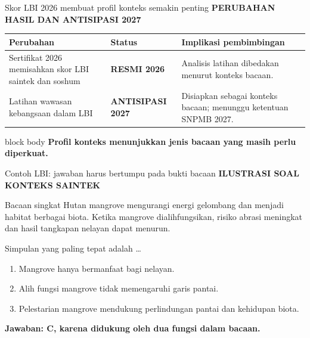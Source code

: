 \documentclass[aspectratio=169,11pt]{beamer}
\newcommand{\kicker}[1]{%
  {\color{StudentCyan}\bfseries\fontsize{10.5}{13}\selectfont\MakeUppercase{#1}}\par\vspace{0.11cm}
}
\newcommand{\statusok}{\textcolor{StudentGreen}{\bfseries RESMI 2026}}
\newcommand{\statuswait}{\textcolor{StudentGold}{\bfseries ANTISIPASI 2027}}
\begin{document}
\begin{frame}{Skor LBI 2026 membuat profil konteks semakin penting}
  \kicker{Perubahan Hasil dan Antisipasi 2027}
  {\fontsize{10.3}{12.8}\selectfont
  \renewcommand{\arraystretch}{0.98}
  \begin{tabularx}{\textwidth}{>{\RaggedRight\arraybackslash}p{} >{\RaggedRight\arraybackslash}p{} >{\RaggedRight\arraybackslash}X}
    \toprule
    \textbf{Perubahan} & \textbf{Status} & \textbf{Implikasi pembimbingan} \\
    \midrule
    Sertifikat 2026 memisahkan skor LBI saintek dan soshum & \statusok & Analisis latihan dibedakan menurut konteks bacaan. \\
    Latihan wawasan kebangsaan dalam LBI & \statuswait & Disiapkan sebagai konteks bacaan; menunggu ketentuan SNPMB 2027. \\
    \bottomrule
  \end{tabularx}}
  \vspace{0.12cm}
  \begin{beamercolorbox}[rounded=true,sep=0.14cm,wd=\textwidth]{block body}
    \centering\bfseries Profil konteks menunjukkan jenis bacaan yang masih perlu diperkuat.
  \end{beamercolorbox}
\end{frame}

\begin{frame}{Contoh LBI: jawaban harus bertumpu pada bukti bacaan}
  \kicker{Ilustrasi Soal Konteks Saintek}
  \begin{block}{Bacaan singkat}
    Hutan mangrove mengurangi energi gelombang dan menjadi habitat berbagai biota. Ketika mangrove dialihfungsikan, risiko abrasi meningkat dan hasil tangkapan nelayan dapat menurun.
  \end{block}
  \vspace{0.06cm}
  {\fontsize{10.8}{13.5}\selectfont Simpulan yang paling tepat adalah \ldots}
  {\fontsize{10.5}{13}\selectfont
  \begin{enumerate}
    \item Mangrove hanya bermanfaat bagi nelayan.
    \item Alih fungsi mangrove tidak memengaruhi garis pantai.
    \item Pelestarian mangrove mendukung perlindungan pantai dan kehidupan biota.
  \end{enumerate}}
  {\color{StudentGreen}\bfseries\fontsize{10.5}{13}\selectfont Jawaban: C, karena didukung oleh dua fungsi dalam bacaan.}
\end{frame}
\end{document}
